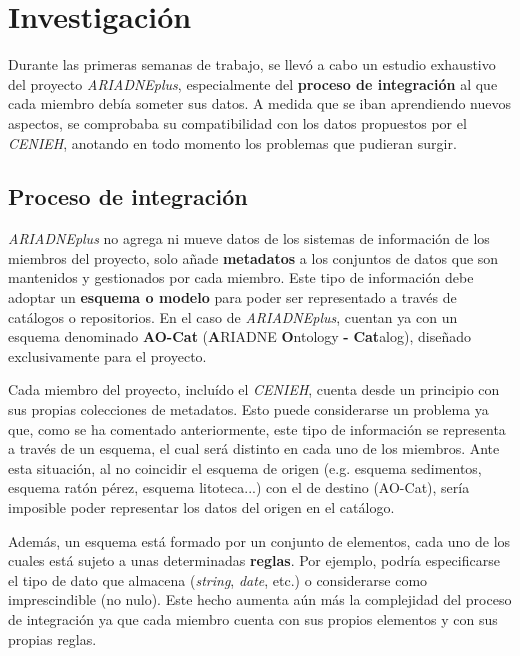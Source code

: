 \section{Investigación}

Durante las primeras semanas de trabajo, se llevó a cabo un estudio
exhaustivo del proyecto \emph{ARIADNEplus}, especialmente del \textbf{proceso
de integración} al que cada miembro debía someter sus datos. A medida
que se iban aprendiendo nuevos aspectos, se comprobaba su compatibilidad
con los datos propuestos por el \emph{CENIEH}, anotando en todo momento los
problemas que pudieran surgir.


\subsection{Proceso de integración}

\emph{ARIADNEplus} no agrega ni mueve datos de los sistemas de información de
los miembros del proyecto, solo añade \textbf{metadatos} a los conjuntos
de datos que son mantenidos y gestionados por cada miembro. Este tipo de 
información debe adoptar un \textbf{esquema o modelo} para poder ser
representado a través de catálogos o repositorios. En el caso de
\emph{ARIADNEplus}, cuentan ya con un esquema denominado \textbf{AO-Cat}
(\textbf{A}RIADNE \textbf{O}ntology \textbf{-} \textbf{Cat}alog),
diseñado exclusivamente para el proyecto.

Cada miembro del proyecto, incluído el \emph{CENIEH}, cuenta desde un principio
con sus propias colecciones de metadatos. Esto puede considerarse un
problema ya que, como se ha comentado anteriormente, este tipo de
información se representa a través de un esquema, el cual será distinto
en cada uno de los miembros. Ante esta situación, al no coincidir el
esquema de origen (e.g. esquema sedimentos, esquema ratón pérez, esquema litoteca...) 
con el de destino (AO-Cat), sería imposible poder representar los datos del origen en el catálogo.


Además, un esquema está formado por un conjunto de elementos, cada uno
de los cuales está sujeto a unas determinadas \textbf{reglas}. Por ejemplo,
podría especificarse el tipo de dato que almacena (\emph{string},
\emph{date}, etc.) o considerarse como imprescindible (no nulo). Este
hecho aumenta aún más la complejidad del proceso de integración ya que
cada miembro cuenta con sus propios elementos y con sus propias reglas.


